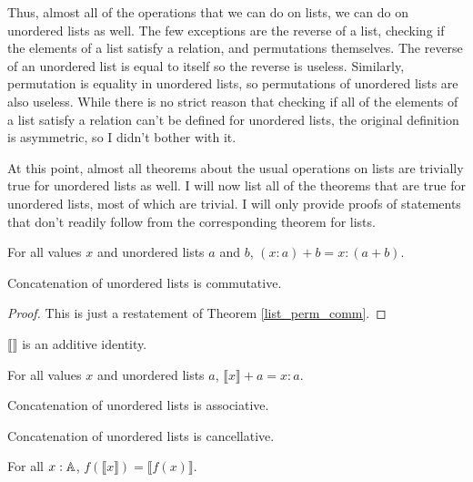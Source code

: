 \documentclass[../math.tex]{subfiles}
\begin{document}
Thus, almost all of the operations that we can do on lists, we can do on
unordered lists as well.  The few exceptions are the reverse of a list, checking
if the elements of a list satisfy a relation, and permutations themselves.  The
reverse of an unordered list is equal to itself so the reverse is useless.
Similarly, permutation is equality in unordered lists, so permutations of
unordered lists are also useless.  While there is no strict reason that checking
if all of the elements of a list satisfy a relation can't be defined for
unordered lists, the original definition is asymmetric, so I didn't bother with
it.

At this point, almost all theorems about the usual operations on lists are
trivially true for unordered lists as well.  I will now list all of the theorems
that are true for unordered lists, most of which are trivial.  I will only
provide proofs of statements that don't readily follow from the corresponding
theorem for lists.

\begin{theorem} \label{ulist_conc_add}
    For all values $x$ and unordered lists $a$ and $b$, $(x : a) + b = x : (a +
    b)$.
\end{theorem}

\begin{instance}
    Concatenation of unordered lists is commutative.
\end{instance}
\begin{proof}
    This is just a restatement of Theorem \ref{list_perm_comm}.
\end{proof}

\begin{instance}
    $\llbracket \rrbracket$ is an additive identity.
\end{instance}

\begin{theorem} \label{ulist_conc_single}
    For all values $x$ and unordered lists $a$, $\llbracket x \rrbracket + a = x
    : a$.
\end{theorem}

\begin{instance}
    Concatenation of unordered lists is associative.
\end{instance}

\begin{instance}
    Concatenation of unordered lists is cancellative.
\end{instance}

\begin{theorem}
    For all $x : \mathbb{A}$, $f(\llbracket x\rrbracket) = \llbracket f(x)\rrbracket$.
\end{theorem}
\end{document}

